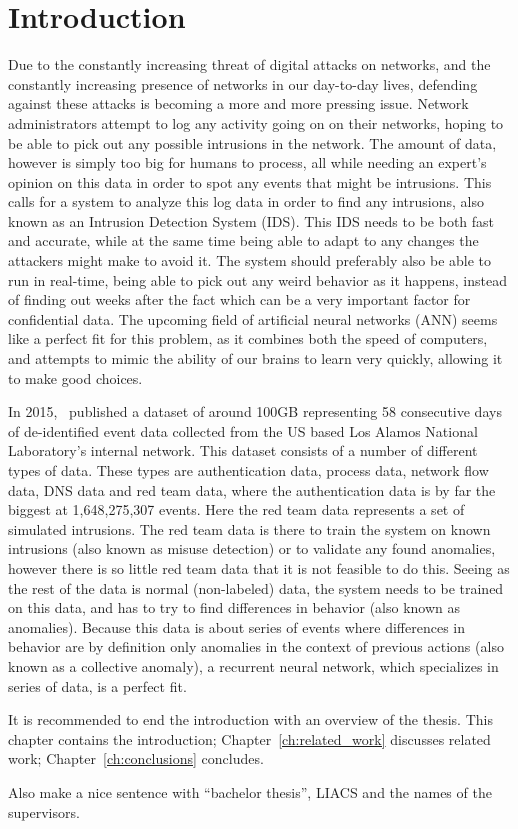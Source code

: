 \chapter{Introduction}\label{ch:introduction}
Due to the constantly increasing threat of digital attacks on networks, and the constantly increasing presence of networks in our day-to-day lives, defending against these attacks is becoming a more and more pressing issue. Network administrators attempt to log any activity going on on their networks, hoping to be able to pick out any possible intrusions in the network. The amount of data, however is simply too big for humans to process, all while needing an expert's opinion on this data in order to spot any events that might be intrusions. This calls for a system to analyze this log data in order to find any intrusions, also known as an Intrusion Detection System (IDS). This IDS needs to be both fast and accurate, while at the same time being able to adapt to any changes the attackers might make to avoid it. The system should preferably also be able to run in real-time, being able to pick out any weird behavior as it happens, instead of finding out weeks after the fact which can be a very important factor for confidential data. The upcoming field of artificial neural networks (ANN) seems like a perfect fit for this problem, as it combines both the speed of computers, and attempts to mimic the ability of our brains to learn very quickly, allowing it to make good choices.

In 2015,~\cite{akent-2015-enterprise-data} published a dataset of around 100GB representing 58 consecutive days of de-identified event data collected from the US based Los Alamos National Laboratory's internal network. This dataset consists of a number of different types of data. These types are authentication data, process data, network flow data, DNS data and red team data, where the authentication data is by far the biggest at 1,648,275,307 events. Here the red team data represents a set of simulated intrusions. The red team data is there to train the system on known intrusions (also known as misuse detection) or to validate any found anomalies, however there is so little red team data that it is not feasible to do this. Seeing as the rest of the data is normal (non-labeled) data, the system needs to be trained on this data, and has to try to find differences in behavior (also known as anomalies). Because this data is about series of events where differences in behavior are by definition only anomalies in the context of previous actions (also known as a collective anomaly), a recurrent neural network, which specializes in series of data, is a perfect fit.

It is recommended to end the introduction with an overview of the thesis. This chapter contains the introduction; Chapter~\ref{ch:related_work} discusses related work; Chapter~\ref{ch:conclusions} concludes.

Also make a nice sentence with ``bachelor thesis'', LIACS and the names of the supervisors.
